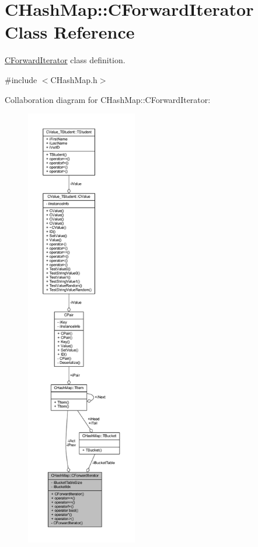 \hypertarget{class_c_hash_map_1_1_c_forward_iterator}{}\section{C\+Hash\+Map\+:\+:C\+Forward\+Iterator Class Reference}
\label{class_c_hash_map_1_1_c_forward_iterator}


\hyperlink{class_c_hash_map_1_1_c_forward_iterator}{C\+Forward\+Iterator} class definition.  




{\ttfamily \#include $<$C\+Hash\+Map.\+h$>$}



Collaboration diagram for C\+Hash\+Map\+:\+:C\+Forward\+Iterator\+:
\nopagebreak
\begin{figure}[H]
\begin{center}
\leavevmode
\includegraphics[height=550pt]{class_c_hash_map_1_1_c_forward_iterator__coll__graph}
\end{center}
\end{figure}
